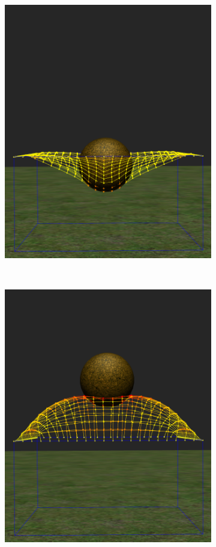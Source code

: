 \begin{figure}
 \centering
  \begin{subfigure}[b]{0.3\textwidth}
    \includegraphics[width=\textwidth]{Img/04/gravityOff1}
  \end{subfigure}
~
  \begin{subfigure}[b]{0.3\textwidth}
    \includegraphics[width=\textwidth]{Img/04/gravityOff2}

\end{subfigure}
\end{figure}
